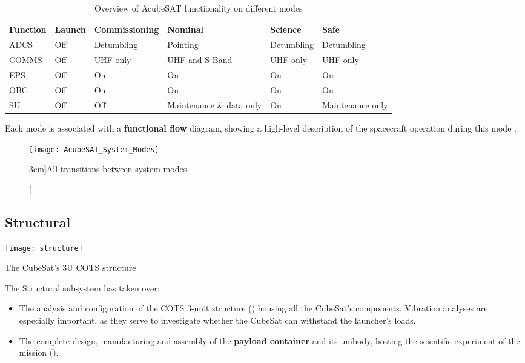 \documentclass[a4paper,nobib]{tufte-book}
\begin{document}
\begin{table}[h]
	\centering
	\caption{Overview of AcubeSAT functionality on different modes}
	\label{tab:acubesatmodes}
	\begin{tabular}{@{}llllll@{}}
		\toprule
		Function    & Launch & Commissioning  & Nominal                 & Science        & Safe             \\ \midrule
		\acs{ADCS}  & \color{off} Off    & Detumbling     & \color{on} Pointing                & Detumbling     & Detumbling       \\
		\acs{COMMS} & \color{off} Off    & \acs{UHF} only & \color{on} \acs{UHF} and S-Band    & \acs{UHF} only & \acs{UHF} only   \\
		\acs{EPS}   & \color{off} Off    & \color{on} On             & \color{on} On                      & \color{on} On             & \color{on} On               \\
		\acs{OBC}   & \color{off} Off    & \color{on} On             & \color{on} On                      & \color{on} On             & \color{on} On               \\
		\acs{SU}    & \color{off} Off    & \color{off} Off            & Maintenance \& data only & \color{on} On             & Maintenance only \\ \bottomrule
	\end{tabular}
	\vspace{1em}
\end{table}


Each mode is associated with a \textbf{functional flow} diagram, showing a high-level description of the spacecraft operation during this mode \autocite{acubesatteam_acubesat_functional_2021}.

\begin{figure}
	\centering
	\texttt{[image: AcubeSAT\_System\_Modes]}
	\caption[][3cm]{All transitions between system modes}
	\label{fig:transitions}
\end{figure}


\subsection{Structural}

\begin{marginfigure}[2cm]
	\centering
	\texttt{[image: structure]}
	\caption{The CubeSat's 3U \acs{COTS} structure}
	\label{fig:structure}
\end{marginfigure}


The Structural subsystem has taken over:
\begin{itemize}
	\item The analysis and configuration of the \ac{COTS} 3-unit structure () housing all the CubeSat's components. Vibration analyses are especially important, as they serve to investigate whether the CubeSat can withstand the launcher's loads.
	\item The complete design, manufacturing and assembly of the \textbf{payload container} and its unibody, hosting the scientific experiment of the mission ().
\end{itemize}
\end{document}
